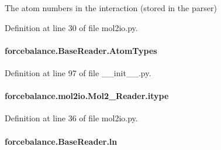 The atom numbers in the interaction (stored in the parser) 



Definition at line 30 of file mol2io.\-py.

\hypertarget{classforcebalance_1_1BaseReader_a69ca7d949a4a3df4d9f61e617fe0e270}{
\paragraph[{Atom\-Types}]{\setlength{\rightskip}{0pt plus 5cm}forcebalance.\-Base\-Reader.\-Atom\-Types\hspace{0.3cm}{\ttfamily [inherited]}}}\label{classforcebalance_1_1BaseReader_a69ca7d949a4a3df4d9f61e617fe0e270}


Definition at line 97 of file \-\_\-\-\_\-init\-\_\-\-\_\-.\-py.

\hypertarget{classforcebalance_1_1mol2io_1_1Mol2__Reader_a86efd5020943bd5cb52a9299e88a4fac}{
\paragraph[{itype}]{\setlength{\rightskip}{0pt plus 5cm}forcebalance.\-mol2io.\-Mol2\-\_\-\-Reader.\-itype}}\label{classforcebalance_1_1mol2io_1_1Mol2__Reader_a86efd5020943bd5cb52a9299e88a4fac}


Definition at line 36 of file mol2io.\-py.

\hypertarget{classforcebalance_1_1BaseReader_a80c8e3bea212600742968aa8669e557b}{
\paragraph[{ln}]{\setlength{\rightskip}{0pt plus 5cm}forcebalance.\-Base\-Reader.\-ln\hspace{0.3cm}{\ttfamily [inherited]}}}\label{classforcebalance_1_1BaseReader_a80c8e3bea212600742968aa8669e557b}


